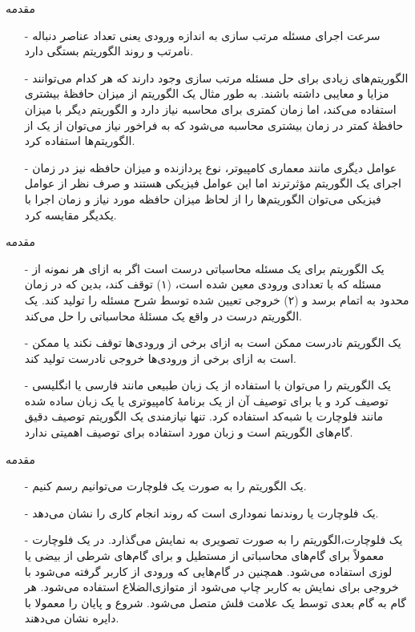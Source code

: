 \begin{frame}{مقدمه}
\begin{itemize}\itemr
\item[-]
سرعت اجرای مسئله مرتب سازی به اندازه ورودی یعنی تعداد عناصر دنباله نامرتب و روند الگوریتم بستگی دارد.
\item[-]
الگوریتم‌های زیادی برای حل مسئله مرتب سازی وجود دارند که هر کدام می‌توانند مزایا و معایبی داشته باشند. به طور مثال یک الگوریتم از میزان حافظهٔ بیشتری استفاده می‌کند، اما زمان کمتری برای محاسبه نیاز دارد و الگوریتم دیگر با میزان حافظهٔ کمتر در زمان بیشتری محاسبه می‌شود که به فراخور نیاز می‌توان از یک از الگوریتم‌ها استفاده کرد.
\item[-]
عوامل دیگری مانند معماری کامپیوتر، نوع پردازنده و میزان حافظه نیز در زمان اجرای یک الگوریتم مؤثرترند اما این عوامل فیزیکی هستند و صرف نظر از عوامل فیزیکی می‌توان الگوریتم‌ها را از لحاظ میزان حافظه مورد نیاز و زمان اجرا با یکدیگر مقایسه کرد.
\end{itemize}
\end{frame}


\begin{frame}{مقدمه}
\begin{itemize}\itemr
\item[-]
یک الگوریتم برای یک مسئله محاسباتی درست است اگر به ازای هر نمونه از مسئله که با تعدادی ورودی معین شده است، (۱) توقف کند، بدین که در زمان محدود به اتمام برسد و (۲) خروجی تعیین شده توسط شرح مسئله را تولید کند. یک الگوریتم درست در واقع یک مسئلهٔ محاسباتی را حل می‌کند.
\item[-]
یک الگوریتم نادرست ممکن است به ازای برخی از ورودی‌ها توقف نکند یا ممکن است به ازای برخی از ورودی‌ها خروجی نادرست تولید کند.
\item[-]
یک الگوریتم را می‌توان با استفاده از یک زبان طبیعی مانند فارسی یا انگلیسی توصیف کرد و یا برای توصیف آن از یک برنامهٔ کامپیوتری یا یک زبان ساده شده مانند فلوچارت یا شبه‌کد استفاده کرد. تنها نیازمندی یک الگوریتم توصیف دقیق گام‌های الگوریتم است و زبان مورد استفاده برای توصیف اهمیتی ندارد.
\end{itemize}
\end{frame}


\begin{frame}{مقدمه}
\begin{itemize}\itemr
\item[-]
یک الگوریتم را به صورت یک فلوچارت
می‌توانیم رسم کنیم.
\item[-]
یک فلوچارت یا روندنما نموداری است که روند انجام کاری را نشان می‌دهد.
\item[-]
یک فلوچارت،الگوریتم را به صورت تصویری به نمایش می‌گذارد. در یک فلوچارت معمولاً برای گام‌های محاسباتی از مستطیل و برای گام‌های شرطی از بیضی یا لوزی استفاده می‌شود. همچنین در گام‌هایی که ورودی از کاربر گرفته می‌شود با خروجی برای نمایش به کاربر چاپ می‌شود از متوازی‌الضلاع استفاده می‌شود. هر گام به گام بعدی توسط یک علامت فلش متصل می‌شود. شروع و پایان را معمولا با دایره نشان می‌دهند.
\end{itemize}
\end{frame}



